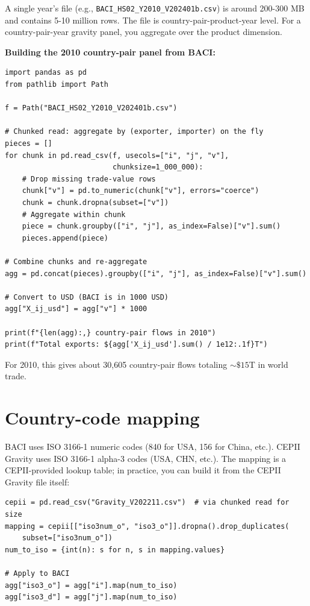 \documentclass[11pt,letterpaper,oneside]{book}
\theoremstyle{definition}
\theoremstyle{remark}
\begin{document}
A single year's file (e.g., \texttt{BACI\_HS02\_Y2010\_V202401b.csv})
is around 200-300 MB and contains 5-10 million rows. The file is
country-pair-product-year level. For a country-pair-year gravity panel,
you aggregate over the product dimension.

\begin{worked}
\textbf{Building the 2010 country-pair panel from BACI:}

\begin{lstlisting}
import pandas as pd
from pathlib import Path

f = Path("BACI_HS02_Y2010_V202401b.csv")

# Chunked read: aggregate by (exporter, importer) on the fly
pieces = []
for chunk in pd.read_csv(f, usecols=["i", "j", "v"],
                         chunksize=1_000_000):
    # Drop missing trade-value rows
    chunk["v"] = pd.to_numeric(chunk["v"], errors="coerce")
    chunk = chunk.dropna(subset=["v"])
    # Aggregate within chunk
    piece = chunk.groupby(["i", "j"], as_index=False)["v"].sum()
    pieces.append(piece)

# Combine chunks and re-aggregate
agg = pd.concat(pieces).groupby(["i", "j"], as_index=False)["v"].sum()

# Convert to USD (BACI is in 1000 USD)
agg["X_ij_usd"] = agg["v"] * 1000

print(f"{len(agg):,} country-pair flows in 2010")
print(f"Total exports: ${agg['X_ij_usd'].sum() / 1e12:.1f}T")
\end{lstlisting}

For 2010, this gives about 30{,}605 country-pair flows totaling
$\sim\$15$T in world trade.
\end{worked}

\section{Country-code mapping}

BACI uses ISO 3166-1 numeric codes (840 for USA, 156 for China,
etc.). CEPII Gravity uses ISO 3166-1 alpha-3 codes (USA, CHN, etc.).
The mapping is a CEPII-provided lookup table; in practice, you can
build it from the CEPII Gravity file itself:

\begin{lstlisting}
cepii = pd.read_csv("Gravity_V202211.csv")  # via chunked read for size
mapping = cepii[["iso3num_o", "iso3_o"]].dropna().drop_duplicates(
    subset=["iso3num_o"])
num_to_iso = {int(n): s for n, s in mapping.values}

# Apply to BACI
agg["iso3_o"] = agg["i"].map(num_to_iso)
agg["iso3_d"] = agg["j"].map(num_to_iso)
\end{lstlisting}
\end{document}
